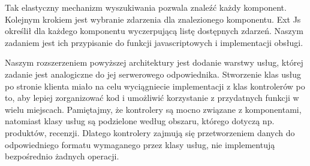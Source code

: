 Tak elastyczny mechanizm wyszukiwania pozwala znaleźć każdy komponent.
Kolejnym krokiem jest wybranie zdarzenia dla znalezionego komponentu. Ext Js określił dla każdego komponentu wyczerpującą listę dostępnych zdarzeń. Naszym zadaniem jest ich przypisanie do funkcji javascriptowych i implementacji obsługi.

Naszym rozszerzeniem powyższej architektury jest dodanie warstwy usług, której zadanie jest analogiczne do jej serwerowego odpowiednika. Stworzenie klas usług po stronie klienta miało na celu wyciągniecie implementacji z klas kontrolerów po to, aby lepiej zorganizować kod i umożliwić korzystanie z przydatnych funkcji w wielu miejscach. Pamiętajmy, że kontrolery są mocno związane z komponentami, natomiast klasy usług są podzielone według obszaru, którego dotyczą np. produktów, recenzji. Dlatego kontrolery zajmują się przetworzeniem danych do odpowiedniego formatu wymaganego przez klasy usług, nie implementują bezpośrednio żadnych operacji.


